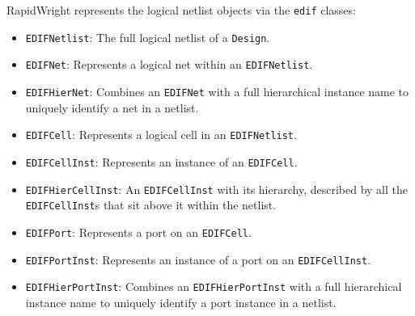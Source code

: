 RapidWright represents the logical netlist objects via the \texttt{edif} classes:
\begin{itemize}
    \item \texttt{EDIFNetlist}: The full logical netlist of a \texttt{Design}. 
    \item \texttt{EDIFNet}: Represents a logical net within an \texttt{EDIFNetlist}.
    \item \texttt{EDIFHierNet}: Combines an \texttt{EDIFNet} with a full hierarchical instance name to uniquely identify a net in a netlist.
    \item \texttt{EDIFCell}: Represents a logical cell in an \texttt{EDIFNetlist}. 
    \item \texttt{EDIFCellInst}: Represents an instance of an \texttt{EDIFCell}. 
    \item \texttt{EDIFHierCellInst}: An \texttt{EDIFCellInst} with its hierarchy, described by all the \texttt{EDIFCellInst}s that sit above it within the netlist.
    \item \texttt{EDIFPort}: Represents a port on an \texttt{EDIFCell}. 
    \item \texttt{EDIFPortInst}: Represents an instance of a port on an \texttt{EDIFCellInst}. 
    \item \texttt{EDIFHierPortInst}: Combines an \texttt{EDIFHierPortInst} with a full hierarchical instance name to uniquely identify a port instance in a netlist. 
\end{itemize}

\newpage

